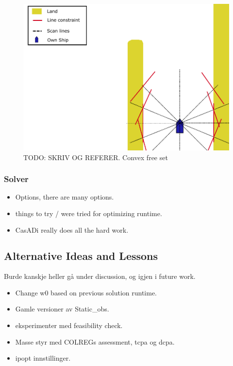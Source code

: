 \begin{figure}
    \centering
    \includegraphics[width=\textwidth]{Images/StaticObs_lines.pdf}
    \caption{TODO: SKRIV OG REFERER. Convex free set}     \label{FIG: Static Obs Lines}
\end{figure} 

\subsubsection{Solver}
\begin{itemize}
    \item Options, there are many options.
    \item things to try / were tried for optimizing runtime.
    \item CasADi really does all the hard work.
\end{itemize}

\subsection{Alternative Ideas and Lessons}
Burde kanskje heller gå under discussion, og igjen i future work.
\begin{itemize}
    \item Change w0 based on previous solution runtime.
    \item Gamle versioner av Static\_obs.
    \item eksperimenter med feasibility check.
    \item Masse styr med COLREGs assessment, tcpa og dcpa.
    \item ipopt innstillinger.
\end{itemize}
\newpage